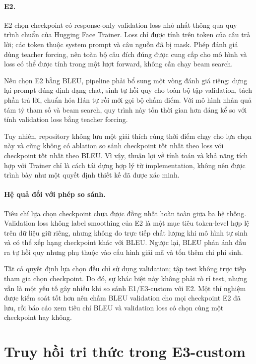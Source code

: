 \documentclass[11pt]{article}
\begin{document}
\paragraph{E2.}
E2 chọn checkpoint có response-only validation loss nhỏ nhất thông qua quy
trình chuẩn của Hugging Face Trainer. Loss chỉ được tính trên token của câu trả
lời; các token thuộc system prompt và câu nguồn đã bị mask. Phép đánh giá dùng
teacher forcing, nên toàn bộ câu đích đúng được cung cấp cho mô hình và loss có
thể được tính trong một lượt forward, không cần chạy beam search.

Nếu chọn E2 bằng BLEU, pipeline phải bổ sung một vòng đánh giá riêng: dựng lại
prompt đúng định dạng chat, sinh tự hồi quy cho toàn bộ tập validation, tách
phần trả lời, chuẩn hóa Hán tự rồi mới gọi bộ chấm điểm. Với mô hình nhân quả
tám tỷ tham số và beam search, quy trình này tốn thời gian hơn đáng kể so với
tính validation loss bằng teacher forcing.

Tuy nhiên, repository không lưu một giải thích cùng thời điểm chạy cho lựa
chọn này và cũng không có ablation so sánh checkpoint tốt nhất theo loss với
checkpoint tốt nhất theo BLEU. Vì vậy, thuận lợi về tính toán và khả năng tích
hợp với Trainer chỉ là cách tái dựng hợp lý từ implementation, không nên được
trình bày như một quyết định thiết kế đã được xác minh.

\paragraph{Hệ quả đối với phép so sánh.}
Tiêu chí lựa chọn checkpoint chưa được đồng nhất hoàn toàn giữa ba hệ thống.
Validation loss không label smoothing của E2 là một mục tiêu token-level hợp
lệ trên dữ liệu giữ riêng, nhưng không đo trực tiếp chất lượng khi mô hình tự
sinh và có thể xếp hạng checkpoint khác với BLEU. Ngược lại, BLEU phản ánh đầu
ra tự hồi quy nhưng phụ thuộc vào cấu hình giải mã và tốn thêm chi phí sinh.

Tất cả quyết định lựa chọn đều chỉ sử dụng validation; tập test không trực
tiếp tham gia chọn checkpoint. Do đó, sự khác biệt này không phải rò rỉ test,
nhưng vẫn là một yếu tố gây nhiễu khi so sánh E1/E3-custom với E2. Một thí
nghiệm được kiểm soát tốt hơn nên chấm BLEU validation cho mọi checkpoint E2
đã lưu, rồi báo cáo xem tiêu chí BLEU và validation loss có chọn cùng một
checkpoint hay không.

\section{Truy hồi tri thức trong E3-custom}
\end{document}
